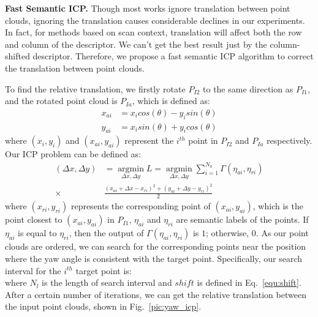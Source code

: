 \documentclass[letterpaper, 10 pt, conference]{ieeeconf}  %
\begin{document}
\textbf{Fast Semantic ICP.}\label{ssc:icp}
Though most works ignore translation between point clouds, ignoring the translation causes considerable declines in our experiments. In fact, for methods based on scan context, translation will affect both the row and column of the descriptor. We can’t get the best result just by the column-shifted descriptor. Therefore, we propose a fast semantic ICP algorithm to correct the translation between point clouds.


To find the relative translation, we firstly rotate \(P_{I2}\) to the same direction as \(P_{I1}\), and the rotated point cloud is \(P_{Ia}\), which is defined as:
 \begin{equation}
     \begin{aligned}
         x_{ai}&=x_icos(\theta)-y_isin(\theta)\\
         y_{ai}&=x_isin(\theta)+y_icos(\theta)
     \end{aligned}
 \end{equation}
where \((x_i,y_i)\) and \((x_{ai},y_{ai})\) represent the \(i^{th}\) point in \(P_{I2}\) and \(P_{Ia}\) respectively. Our ICP problem can be defined as:
 \begin{equation}\label{eq:icp}
     \begin{aligned}
        (\Delta x,\Delta y)&=\mathop{argmin}\limits_{\Delta x,\Delta y}L=\mathop{argmin}\limits_{\Delta x,\Delta y}\sum_{i = 1}^{N_a}\Gamma(\eta_{ai},\eta_{ri})\\
        \times&\frac{(x_{ai}+\Delta x-x_{ri})^2+(y_{ai}+\Delta y-y_{ri})^2}{2}
     \end{aligned}
 \end{equation}
 where \((x_{ri},y_{ri})\) represents the corresponding point of \((x_{ai},y_{ai})\), which is the point closest to \((x_{ai},y_{ai})\) in \(P_{I1}\), $\eta_{ai}$ and $\eta_{ri}$ are semantic labels of the points. If $\eta_{ai}$ is equal to $\eta_{ri}$, then the output of $\Gamma(\eta_{ai},\eta_{ri})$ is $1$; otherwise, $0$. As our point clouds are ordered, we can search for the corresponding points near the position where the yaw angle is consistent with the target point. Specifically, our search interval for the \(i^{th}\) target point is:
 \begin{equation}
     [i+shift-\frac{N_l}{2},i+shift+\frac{N_l}{2}]
 \end{equation}
 where \(N_l\) is the length of search interval and \(shift\) is defined in Eq.~\ref{equ:shift}. After a certain number of iterations, we can get the relative translation between the input point clouds, shown in Fig.~\ref{pic:yaw_icp}.
\end{document}
